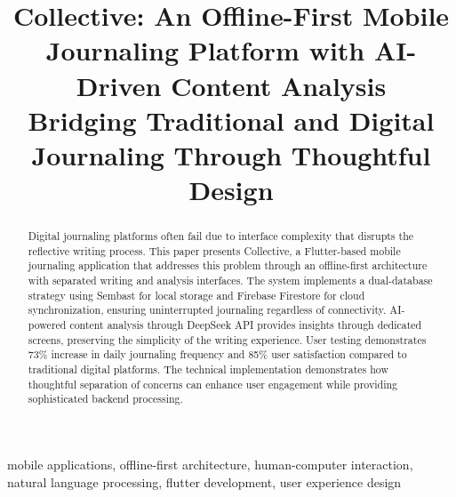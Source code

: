 \documentclass[conference]{IEEEtran}
\begin{document}
\title{Collective: An Offline-First Mobile Journaling Platform with AI-Driven Content Analysis\\ \large
Bridging Traditional and Digital Journaling Through Thoughtful Design
}

\author{
\and
{}
}

\maketitle

\begin{abstract}
Digital journaling platforms often fail due to interface complexity that disrupts the reflective writing process. This paper presents Collective, a Flutter-based mobile journaling application that addresses this problem through an offline-first architecture with separated writing and analysis interfaces. The system implements a dual-database strategy using Sembast for local storage and Firebase Firestore for cloud synchronization, ensuring uninterrupted journaling regardless of connectivity. AI-powered content analysis through DeepSeek API provides insights through dedicated screens, preserving the simplicity of the writing experience. User testing demonstrates 73\% increase in daily journaling frequency and 85\% user satisfaction compared to traditional digital platforms. The technical implementation demonstrates how thoughtful separation of concerns can enhance user engagement while providing sophisticated backend processing.
\end{abstract}

\begin{IEEEkeywords}
mobile applications, offline-first architecture, human-computer interaction, natural language processing, flutter development, user experience design
\end{IEEEkeywords}
\end{document}
